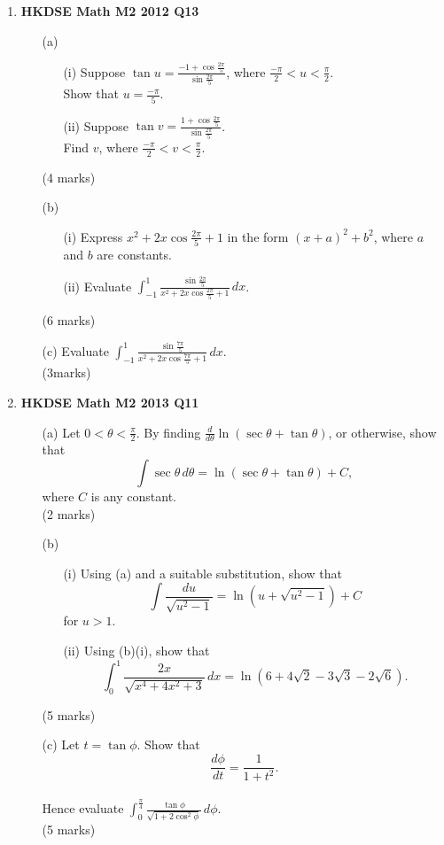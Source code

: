 \documentclass{report}
\begin{document}
\begin{enumerate}
	\item \textbf{HKDSE Math M2 2012 Q13}
	\begin{enumerate}
		\item [(a)]
		\begin{enumerate}
			\item [(i)]Suppose $\tan{u} = \displaystyle\frac{-1 + \cos{\displaystyle\frac{2\pi}{5}}}{\sin{\displaystyle\frac{2\pi}{5}}}$, where $\displaystyle\frac{-\pi}{2} < u < \frac{\pi}{2}$. \\
			Show that $u = \displaystyle\frac{-\pi}{5}$. 
			\item [(ii)]Suppose $\tan{v} = \displaystyle\frac{1+\cos{\displaystyle\frac{2\pi}{5}}}{\sin{\displaystyle\frac{2\pi}{5}}}$. \\
			Find $v$, where $\displaystyle\frac{-\pi}{2} < v < \frac{\pi}{2}$.
		\end{enumerate}
		(4 marks)
		\item[(b)]
		\begin{enumerate}
			\item[(i)]Express $x^2 + 2x\cos{\displaystyle\frac{2\pi}{5}} + 1$ in the form $(x+a)^2 + b^2$, where $a$ and $b$ are constants. 
			\item[(ii)]Evaluate $\displaystyle\int_{-1}^{1}\frac{\sin{\displaystyle\frac{2\pi}{5}}}{x^2 + 2x\cos{\displaystyle\frac{2\pi}{5}}+1}\, dx$.
		\end{enumerate}
		(6 marks)
		\item[(c)]Evaluate $\displaystyle\int_{-1}^{1}\frac{\sin{\displaystyle\frac{7\pi}{5}}}{x^2 + 2x\cos{\displaystyle\frac{7\pi}{5}}+1} \,dx$. \\(3marks)
	\end{enumerate}

	\newpage

	\item \textbf{HKDSE Math M2 2013 Q11}
	\begin{enumerate}
		\item [(a)]Let $0 < \theta < \displaystyle\frac{\pi}{2}$. By finding $\displaystyle\frac{d}{d\theta} \ln{(\sec{\theta} + \tan{\theta})}$, or otherwise, show that $$\displaystyle\int\sec{\theta}\,d\theta =\ln{(\sec{\theta} + \tan{\theta})} + C,$$where $C$ is any constant. \\(2 marks)
		\item [(b)]
		\begin{enumerate}
			\item [(i)]Using (a) and a suitable substitution, show that $$\displaystyle\int\frac{du}{\sqrt{u^2-1}} = \ln{(u + \sqrt{u^2-1})} + C$$ for $u > 1$.
			\item [(ii)]Using (b)(i), show that $$\displaystyle\int_{0}^{1}\frac{2x}{\sqrt{x^4+4x^2+3}}\,dx = \ln{(6 + 4\sqrt{2} - 3\sqrt{3} - 2\sqrt{6})}.$$
		\end{enumerate}
		(5 marks)
		\item [(c)]Let $t = \tan{\phi}$. Show that $$\displaystyle\frac{d\phi}{dt} = \frac{1}{1+t^2}.$$ \\
		Hence evaluate $\displaystyle\int_0^{\tfrac{\pi}{4}}\frac{\tan{\phi}}{\sqrt{1+2\cos^2{\phi}}}\,d\phi$. \\(5 marks)
	\end{enumerate}


\end{enumerate}
\end{document}
